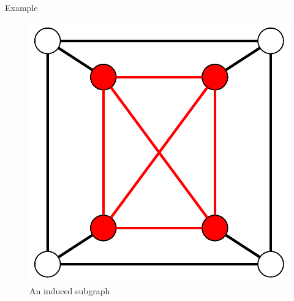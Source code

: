 \documentclass{beamer}
\theoremstyle{plain}
\begin{document}
\begin{frame}{Example}
\begin{figure}
\begin{overprint}
				\centering\includegraphics[scale=.5]{induced_subgraph.pdf}\caption{An induced subgraph}
			\end{overprint}
		\end{figure}
	\end{frame}
\end{document}
